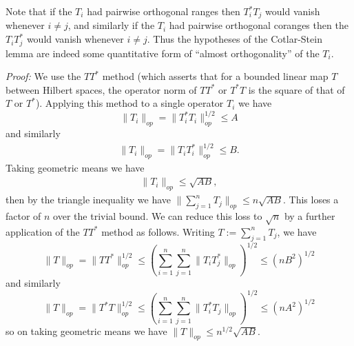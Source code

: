 \documentclass[11pt]{article}
\theoremstyle{definition}
\begin{document}
Note that if the \({T_i}\) had pairwise orthogonal ranges then \({T_i^* T_j}\) would vanish whenever \({i \neq j}\), and similarly if the \({T_i}\) had pairwise orthogonal coranges then the \({T_i T_j^*}\) would vanish whenever \({i \neq j}\). Thus the hypotheses of the Cotlar-Stein lemma are indeed some quantitative form of “almost orthogonality” of the \({T_i}\).


\emph{Proof:}  We use the \({TT^*}\) method (which asserts that for a bounded linear map \({T}\) between Hilbert spaces, the operator norm of \({TT^*}\) or \({T^* T}\) is the square of that of \({T}\) or \({T^*}\)). Applying this method to a single operator \({T_i}\) we have 
\[\displaystyle  \|T_i\|_{op} = \| T_i^* T_i \|_{op}^{1/2} \leq A \]
 and similarly 
\begin{align}\label{opa}
  \|T_i\|_{op} = \| T_i T_i^* \|_{op}^{1/2} \leq B. 
\end{align}
 Taking geometric means we have 
\begin{align}\label{tia}
  \|T_i\|_{op} \leq \sqrt{AB}, 
\end{align}
 then by the triangle inequality we have \({\|\sum_{j=1}^n T_j \|_{op} \leq n \sqrt{AB}}\). This loses a factor of \({n}\) over the trivial bound. We can reduce this loss to \({\sqrt{n}}\) by a further application of the \({TT^*}\) method as follows. Writing \({T := \sum_{j=1}^n T_j}\), we have 
\[\displaystyle  \| T \|_{op} = \| TT^* \|_{op}^{1/2} \leq (\sum_{i=1}^n \sum_{j=1}^n \| T_i T_j^* \|_{op})^{1/2} \leq (nB^2)^{1/2}\]
 and similarly 
\[\displaystyle  \| T \|_{op} = \| T^*T \|_{op}^{1/2} \leq (\sum_{i=1}^n \sum_{j=1}^n \| T_i^* T_j \|_{op})^{1/2} \leq (nA^2)^{1/2}\]
 so on taking geometric means we have \({\|T\|_{op} \leq n^{1/2} \sqrt{AB}}\). 
\end{document}
